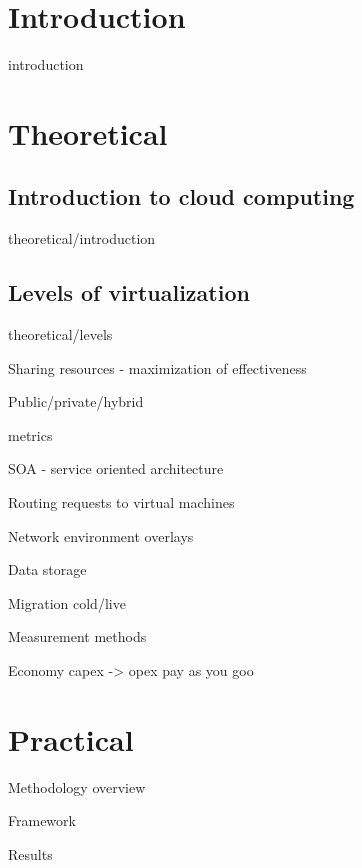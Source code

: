 \documentclass[12pt,oneside,a4paper]{report} %
\begin{document}
\tableofcontents
\cleardoublepage

\pagestyle{plain}

\chapter{Introduction}
{introduction}

\chapter{Theoretical}
	\section{Introduction to cloud computing}
	{theoretical/introduction}

	\section{Levels of virtualization}
	{theoretical/levels}

	\pagebreak

	Sharing resources - maximization of effectiveness

	Public/private/hybrid

	metrics

	SOA - service oriented architecture

	Routing requests to virtual machines

	Network environment
		overlays

	Data storage

	Migration
		cold/live
			
	Measurement methods

	Economy
		capex -> opex
		pay as you goo
	



\chapter{Practical}
	Methodology overview

	Framework

	Results



\newpage
{} \label{listoffig}
\listoffigures

\newpage
{} \label{listoftab}
\listoftables
\end{document}

